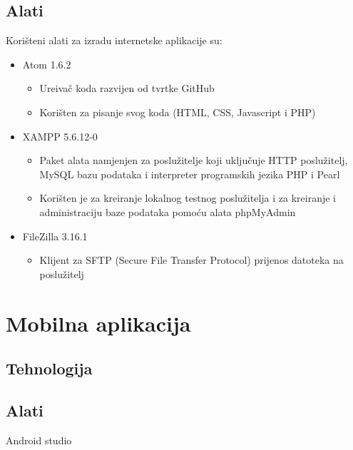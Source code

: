 \subsection{Alati}
Kori\v{s}teni alati za izradu internetske aplikacije su:
\begin{itemize}
	\item Atom 1.6.2 \cite{atom}
	\begin{itemize}
		\item Ure\dj iva\v{c} koda razvijen od tvrtke GitHub
		\item Kori\v{s}ten za pisanje svog koda (HTML, CSS, Javascript i PHP)
	\end{itemize}
	
	\item XAMPP 5.6.12-0 \cite{xampp}
	\begin{itemize}
		\item Paket alata namjenjen za poslu\v{z}itelje koji uklju\v{c}uje HTTP poslu\v{z}itelj, MySQL bazu podataka i interpreter programskih jezika PHP i Pearl
		\item Kori\v{s}ten je za kreiranje lokalnog testnog poslu\v{z}itelja i za kreiranje i administraciju baze podataka pomo\'{c}u alata phpMyAdmin
	\end{itemize}
	
	\item FileZilla 3.16.1 \cite{filezilla}
	\begin{itemize}
		\item Klijent za SFTP (Secure File Transfer Protocol) prijenos datoteka na poslu\v{z}itelj
	\end{itemize}
\end{itemize}


\section{Mobilna aplikacija}

\subsection{Tehnologija}


\subsection{Alati}
Android studio



